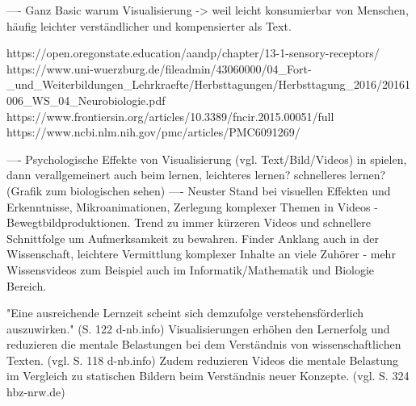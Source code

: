 ---- Ganz Basic warum Visualisierung -> weil leicht konsumierbar von Menschen, häufig leichter verständlicher und kompensierter als Text. 

https://open.oregonstate.education/aandp/chapter/13-1-sensory-receptors/
https://www.uni-wuerzburg.de/fileadmin/43060000/04\_Fort-\_und\_Weiterbildungen\_Lehrkraefte/Herbsttagungen/Herbsttagung\_2016/20161006\_WS\_04\_Neurobiologie.pdf
https://www.frontiersin.org/articles/10.3389/fncir.2015.00051/full
https://www.ncbi.nlm.nih.gov/pmc/articles/PMC6091269/



---- Psychologische Effekte von Visualisierung (vgl. Text/Bild/Videos) in spielen, dann verallgemeinert auch beim lernen, leichteres lernen? schnelleres lernen? (Grafik zum biologischen sehen) 
---- Neuster Stand bei visuellen Effekten und Erkenntnisse, Mikroanimationen, Zerlegung komplexer Themen in Videos - Bewegtbildproduktionen. Trend zu immer kürzeren Videos und schnellere Schnittfolge um Aufmerksamkeit zu bewahren. Finder Anklang auch in der Wissenschaft, leichtere Vermittlung komplexer Inhalte an viele Zuhörer - mehr Wissensvideos zum Beispiel auch im Informatik/Mathematik und Biologie Bereich. 

"Eine ausreichende Lernzeit scheint sich
demzufolge verstehensförderlich auszuwirken." (S. 122 d-nb.info)
Visualisierungen erhöhen den Lernerfolg und reduzieren die mentale Belastungen bei dem Verständnis von wissenschaftlichen Texten. (vgl. S. 118 d-nb.info)
Zudem reduzieren Videos die mentale Belastung im Vergleich zu statischen Bildern beim Verständnis neuer Konzepte. (vgl. S. 324 hbz-nrw.de)